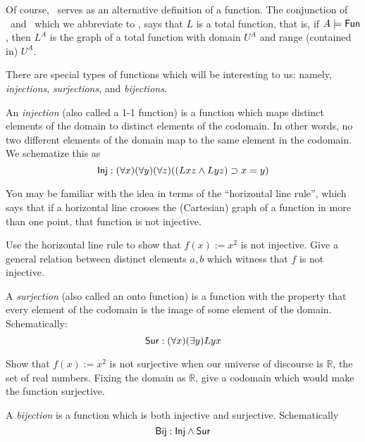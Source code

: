 Of course, \sv\ serves as an alternative definition of a function. The conjunction of \sv\ and \tot\, which we abbreviate to \fun, says that $L$ is a total function, that is, if $A\models\mbox{$\mathsf{Fun}$}$, then $L^A$ is the graph of a total function with domain $U^A$ and range (contained in) $U^A$. 


There are special types of functions which will be interesting to us: namely, \emph{injections}, \emph{surjections}, and \emph{bijections}. 

\begin{definition}
An \emph{injection} (also called a 1-1 function) is a function which maps distinct elements of the domain to distinct elements of the codomain. In other words, no two different elements of the domain map to the same element in the codomain. We schematize this as
\[
    \mbox{$\mathsf{Inj}$}: (\forall x)(\forall y)(\forall z)((Lxz\wedge Lyz)\supset x=y)
\]
\end{definition}


You may be familiar with the idea in terms of the ``horizontal line rule'', which says that if a horizontal line crosses the (Cartesian) graph of a function in more than one point, that function is not injective.

\begin{aside}
    Use the horizontal line rule to show that $f(x) := x^2$ is not injective. Give a general relation between distinct elements $a, b$ which witness that $f$ is not injective. 
\end{aside}


\begin{definition}
A \emph{surjection} (also called an onto function) is a function with the property that every element of the codomain is the image of some element of the domain. Schematically:
\[
    \mbox{$\mathsf{Sur}$}: (\forall x)(\exists y)Lyx
\]
\end{definition}

\begin{aside}
    Show that $f(x) := x^2$ is not surjective when our universe of discourse is $\mathbb{R}$, the set of real numbers. Fixing the domain as $\mathbb{R}$, give a codomain which would make the function surjective. 
\end{aside}

\begin{definition}
A \emph{bijection} is a function which is both injective and surjective. Schematically
\[
    \mbox{$\mathsf{Bij}$}: \mbox{$\mathsf{Inj}$} \land \mbox{$\mathsf{Sur}$}
\]
\end{definition}

